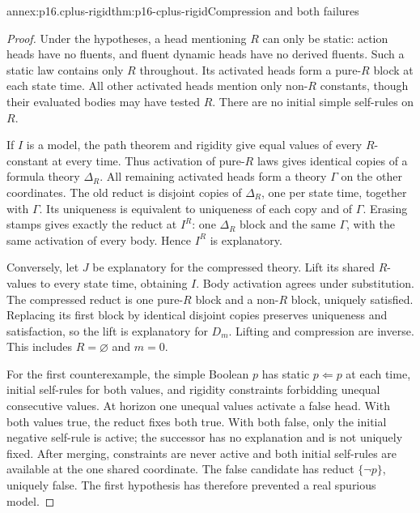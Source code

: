 \begin{annexitem}{annex:p16.cplus-rigid}{thm:p16-cplus-rigid}{Compression and both failures}
\begin{proof}
Under the hypotheses, a head mentioning \(R\) can only be static:
action heads have no fluents, and fluent dynamic heads have no
derived fluents. Such a static law contains only \(R\) throughout.
Its activated heads form a pure-\(R\) block at each state time.
All other activated heads mention only non-\(R\) constants, though
their evaluated bodies may have tested \(R\). There are no initial
simple self-rules on \(R\).

If \(I\) is a model, the path theorem and rigidity give equal values
of every \(R\)-constant at every time. Thus activation of pure-\(R\)
laws gives identical copies of a formula theory \(\Delta_R\).
All remaining activated heads form a theory \(\Gamma\) on the other
coordinates. The old reduct is disjoint copies of \(\Delta_R\), one
per state time, together with \(\Gamma\).
Its uniqueness is equivalent to uniqueness of each copy and of
\(\Gamma\). Erasing stamps gives exactly the reduct at \(I^R\):
one \(\Delta_R\) block and the same \(\Gamma\), with the same
activation of every body. Hence \(I^R\) is explanatory.

Conversely, let \(J\) be explanatory for the compressed theory.
Lift its shared \(R\)-values to every state time, obtaining \(I\).
Body activation agrees under substitution. The compressed reduct is
one pure-\(R\) block and a non-\(R\) block, uniquely satisfied.
Replacing its first block by identical disjoint copies preserves
uniqueness and satisfaction, so the lift is explanatory for \(D_m\).
Lifting and compression are inverse. This includes \(R=\varnothing\)
and \(m=0\).

For the first counterexample, the simple Boolean \(p\) has static
\(p\Leftarrow p\) at each time, initial self-rules for both values,
and rigidity constraints forbidding unequal consecutive values.
At horizon one unequal values activate a false head.
With both values true, the reduct fixes both true.
With both false, only the initial negative self-rule is active;
the successor has no explanation and is not uniquely fixed.
After merging, constraints are never active and both initial
self-rules are available at the one shared coordinate.
The false candidate has reduct \(\{\neg p\}\), uniquely false.
The first hypothesis has therefore prevented a real spurious model.


\end{proof}
\end{annexitem}
